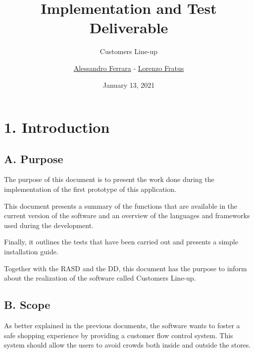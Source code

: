 
\graphicspath{ {assets/} }
\usepackage{dirtree}

\title{Implementation and Test Deliverable}
\subtitle{Customers Line-up}
\author{\href{https://github.com/ferrohd}{Alessandro Ferrara} -
\href{https://github.com/lorenzofratus}{Lorenzo Fratus}}
\date{January 13, 2021}



\maketitle

\tableofcontents

\chapter{1. Introduction}

\section{A. Purpose}

The purpose of this document is to present the work done during the implementation of the first prototype of this application.

This document presents a summary of the functions that are available in the current version of the software and an overview of the languages and frameworks used during the development.

Finally, it outlines the tests that have been carried out and presents a simple installation guide.

Together with the RASD and the DD, this document has the purpose to inform about the realization of the software called Customers Line-up.

\section{B. Scope}

As better explained in the previous documents, the software wants to foster a safe shopping experience by providing a customer flow control system. This system should allow the users to avoid crowds both inside and outside the stores.

